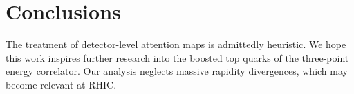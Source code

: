 \section{Conclusions}\label{sec:conclusions}

The treatment of detector-level attention maps is admittedly heuristic.
We hope this work inspires further research into the boosted top quarks
of the three-point energy correlator. Our analysis neglects massive
rapidity divergences, which may become relevant at RHIC.

